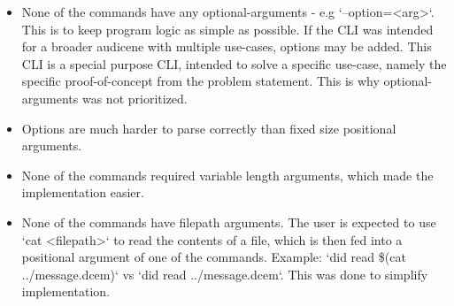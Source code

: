 \begin{itemize}
\item None of the commands have any optional-arguments - e.g `--option=<arg>`. This is to keep program logic as simple as possible. If the CLI was intended for a broader audicene with multiple use-cases, options may be added. This CLI is a special purpose CLI, intended to solve a specific use-case, namely the specific proof-of-concept from the problem statement. This is why optional-arguments was not prioritized.
\item Options are much harder to parse correctly than fixed size positional arguments.
\item None of the commands required variable length arguments, which made the implementation easier.
\item None of the commands have filepath arguments. The user is expected to use `cat <filepath>` to read the contents of a file, which is then fed into a positional argument of one of the commands. Example: `did read \$(cat ../message.dcem)` vs `did read ../message.dcem`. This was done to simplify implementation.
\end{itemize}